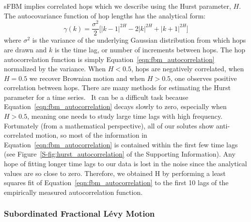\documentclass{article}
\begin{document}
  sFBM implies correlated hops which we describe using the Hurst parameter, $H$. 
  The autocovariance function of hop lengths has the analytical form:~\cite{mandelbrot_fractional_1968}
  \begin{equation}
    \gamma(k) = \dfrac{\sigma^2}{2}\bigg[|k-1|^{2H} - 2|k|^{2H} + |k+1|^{2H}\bigg]
  \label{eqn:fbm_autocorrelation}
  \end{equation}
  where $\sigma^2$ is the variance of the underlying Gaussian distribution from which hops are
  drawn and $k$ is the time lag, or number of increments between hops. The hop autocorrelation
  function is simply Equation~\ref{eqn:fbm_autocorrelation} normalized by the variance. 
  When $H < 0.5$, hops are negatively correlated, when $H = 0.5$ we recover Brownian motion
  and when $H > 0.5$, one observes positive correlation between hops. There are many methods
  for estimating the Hurst parameter for a time series.~\cite{clegg_practical_2006} It can
  be a difficult task because Equation~\ref{eqn:fbm_autocorrelation} decays slowly to zero, 
  especially when $H > 0.5$, meaning one needs to study large time lags with high frequency.
  Fortunately (from a mathematical perspective), all of our solutes show anti-correlated motion, so most of the information in
  Equation~\ref{eqn:fbm_autocorrelation} is contained within the first few time lags (see 
  Figure~\ref{S-fig:hurst_autocorrelation} of the Supporting Information). Any hope of
  fitting longer time lags to our data is lost in the noise since the analytical values
  are so close to zero. Therefore, we obtained H by performing a least squares fit of 
  Equation~\ref{eqn:fbm_autocorrelation} to the first 10 lags of the empirically measured
  autocorrelation function.

  \subsubsection*{Subordinated Fractional L\'evy Motion}
\end{document}
